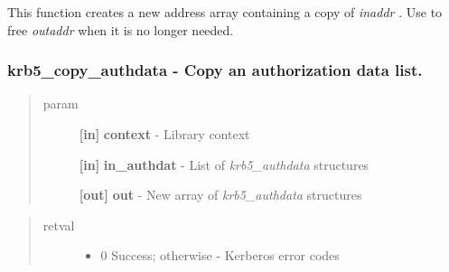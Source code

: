 \documentclass[letterpaper,10pt,english]{sphinxmanual}
\begin{document}
This function creates a new address array containing a copy of \emph{inaddr} . Use {\hyperref[appdev/refs/api/krb5_free_addresses:krb5_free_addresses]{}} to free \emph{outaddr} when it is no longer needed.


\subsubsection{krb5\_copy\_authdata -  Copy an authorization data list.}
\label{appdev/refs/api/krb5_copy_authdata:krb5-copy-authdata-copy-an-authorization-data-list}\label{appdev/refs/api/krb5_copy_authdata::doc}

\begin{fulllineitems}
\label{appdev/refs/api/krb5_copy_authdata:krb5_copy_authdata}
\end{fulllineitems}

\begin{quote}\begin{description}
\item[{param}] \leavevmode
\textbf{{[}in{]}} \textbf{context} - Library context

\textbf{{[}in{]}} \textbf{in\_authdat} - List of \emph{krb5\_authdata} structures

\textbf{{[}out{]}} \textbf{out} - New array of \emph{krb5\_authdata} structures

\end{description}\end{quote}
\begin{quote}\begin{description}
\item[{retval}] \leavevmode\begin{itemize}
\item {} 
0   Success; otherwise - Kerberos error codes

\end{itemize}

\end{description}\end{quote}
\end{document}
